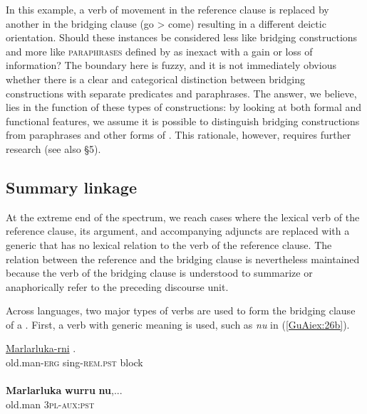 \documentclass[output=paper]{LSP/langsci}
\begin{document}
\noindent
In this example, a verb of movement in the reference clause is replaced by another in the bridging clause (go > come) resulting in a different deictic orientation. Should these instances be considered less like bridging constructions and more like \textsc{paraphrases} defined by \citet[][382--383]{longacre07} as inexact  with a gain or loss of information? The boundary here is fuzzy, and it is not immediately obvious whether there is a clear and categorical distinction between bridging constructions with separate predicates and paraphrases. The answer, we believe, lies in the function of these types of constructions: by looking at both formal and functional features, we assume it is possible to distinguish bridging constructions from paraphrases and other forms of . This rationale, however, requires further research (see also §5).

\subsection{Summary linkage}
\label{GuAi32summ.link}
At the extreme end of the  spectrum, we reach cases where the lexical verb of the reference clause, its argument, and accompanying adjuncts are replaced with a generic  that has no lexical relation to the verb of the reference clause. The relation between the reference and the bridging clause is nevertheless maintained because the verb of the bridging clause is understood to summarize or anaphorically refer to the preceding discourse unit.

Across languages, two major types of verbs are used to form the bridging clause of a . First, a verb with generic meaning is used, such as \textit{nu} in (\ref{GuAiex:26b}).

\begin{exe}
\ex \label{GuAiex:26ab}
 {\citealt{Pensalfini}}
\begin{xlist}
\ex \label{GuAiex:26a}
\gll \underline{Marlarluka-rni}    \underline{}  \underline{}. \\
old.man-\textsc{erg}     sing-\textsc{rem.pst}    block\\
\glt {} \\
\ex \label{GuAiex:26b}
\gll  \textbf{Marlarluka}   \textbf{wurru} \textbf{nu},...\\
 old.man   \textsc{3pl}-\textsc{aux:pst}\\
\glt {} 
\end{xlist}
\end{exe}
\end{document}
